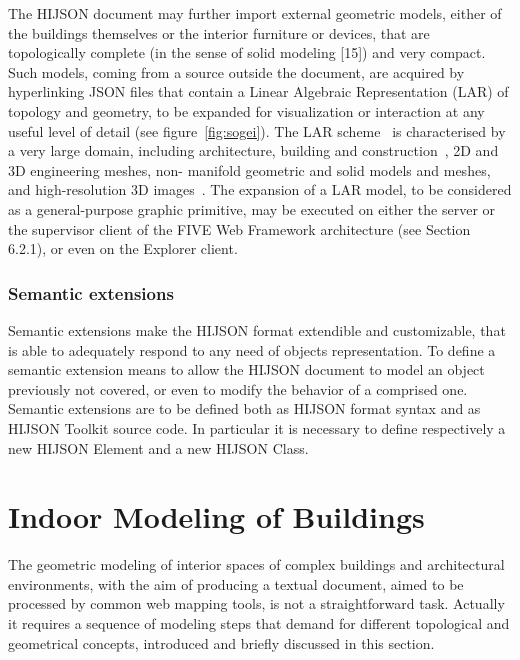 \documentclass[]{egpubl}
\begin{document}
The HIJSON document may further import external geometric models, either of
the buildings themselves or the interior furniture or devices, that are
topologically complete (in the sense of solid modeling [15]) and very compact.
Such models, coming from a source outside the document, are acquired by
hyperlinking JSON files that contain a Linear Algebraic Representation (LAR)
of topology and geometry, to be expanded for visualization or interaction at
any useful level of detail (see figure~\ref{fig:sogei}). The LAR
scheme~\cite{Dicarlo:2014:TNL:2543138.2543294} is characterised by a very
large domain, including architecture, building and
construction~\cite{paoluzziMS:2014}, 2D and 3D engineering meshes, non-
manifold geometric and solid models and meshes, and high-resolution 3D
images~\cite{cadanda:2015}.  The expansion of a LAR model, to be considered as
a general-purpose graphic primitive, may be executed on either the server or
the supervisor client of the FIVE Web Framework architecture (see Section
6.2.1), or even on the Explorer client.


\subsubsection*{Semantic extensions} Semantic extensions make the HIJSON format
extendible and customizable, that is able to adequately respond to any need of
objects representation. To define a semantic extension means to allow the
HIJSON document to model an object previously not covered, or even to modify
the behavior of a comprised one. Semantic extensions are to be defined both as
HIJSON format syntax and as HIJSON Toolkit source code. In particular it is
necessary to define respectively a new HIJSON Element and a new HIJSON Class.


\section{Indoor Modeling of Buildings}

The geometric modeling of interior spaces of complex buildings and architectural environments, with the aim of producing a textual document, aimed to be processed by common web mapping tools,  is not a straightforward task. Actually it requires a sequence of modeling steps that demand for different topological and geometrical concepts, introduced and briefly discussed in this section.

\end{document}
